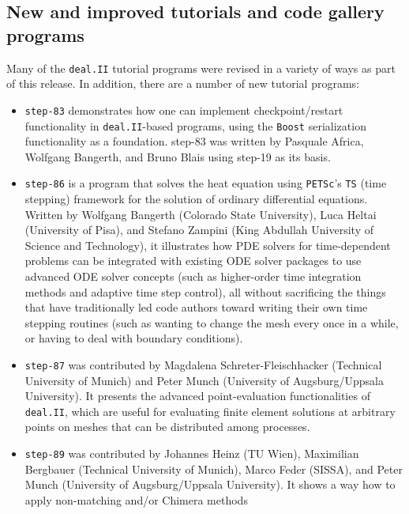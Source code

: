 \documentclass{ansarticle-preprint}
\newcommand{\specialword}[1]{\texttt{#1}}
\newcommand{\dealii}{{\specialword{deal.II}}\xspace}
\newcommand{\petsc}{\specialword{PETSc}\xspace}
\newcommand{\ts}{{\specialword{TS}}\xspace}
\newcommand{\boost}{{\specialword{Boost}}\xspace}
\begin{document}
\subsection{New and improved tutorials and code gallery programs}
\label{subsec:steps}

Many of the \dealii tutorial programs were revised in a variety of ways
as part of this release. In addition, there are a number of new tutorial
programs:
\begin{itemize}
  \item
    \texttt{step-83}
    demonstrates how one can implement
    checkpoint/restart functionality in \dealii-based programs,
    using the \boost{} serialization functionality as a
    foundation. step-83 was written by Pasquale Africa, Wolfgang
    Bangerth, and Bruno Blais using step-19 as its basis.
  \item
    \texttt{step-86}
    is a program that solves the heat equation using \petsc's \ts{} (time
    stepping) framework for the solution of ordinary differential
    equations. Written by Wolfgang Bangerth (Colorado State
    University), Luca Heltai (University of Pisa), and Stefano Zampini
    (King Abdullah University of Science and Technology), it
    illustrates how PDE solvers for time-dependent problems can be
    integrated with existing ODE solver packages to use advanced ODE
    solver concepts (such as higher-order time integration methods and
    adaptive time step control), all without sacrificing the things
    that have traditionally led code authors toward writing their own
    time stepping routines (such as wanting to change the mesh every
    once in a while, or having to deal with boundary conditions).
  \item
    \texttt{step-87} was contributed by Magdalena Schreter-Fleischhacker
    (Technical University of Munich) and Peter Munch
    (University of Augsburg/Uppsala University). It
    presents the advanced point-evaluation functionalities of \dealii,
    which are useful for evaluating finite element solutions at
    arbitrary points on meshes that can be distributed among processes.
  \item
    \texttt{step-89} was contributed by Johannes Heinz (TU Wien),
    Maximilian Bergbauer (Technical University of Munich),
    Marco Feder (SISSA), and Peter Munch (University of Augsburg/Uppsala University).
    It shows a way how to apply non-matching and/or Chimera methods

\end{itemize}
\end{document}
